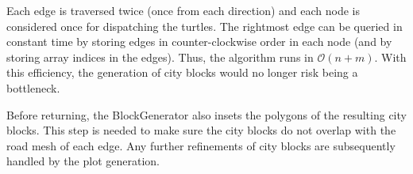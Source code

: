 Each edge is traversed twice (once from each direction) and each node is considered once for dispatching the turtles.
The rightmost edge can be queried in constant time by storing edges in counter-clockwise order in each node (and by storing array indices in the edges).
Thus, the algorithm runs in $\mathcal{O}(n + m)$.
With this efficiency, the generation of city blocks would no longer risk being a bottleneck.

Before returning, the BlockGenerator also insets the polygons of the resulting city blocks.
This step is needed to make sure the city blocks do not overlap with the road mesh of each edge.
Any further refinements of city blocks are subsequently handled by the plot generation.

